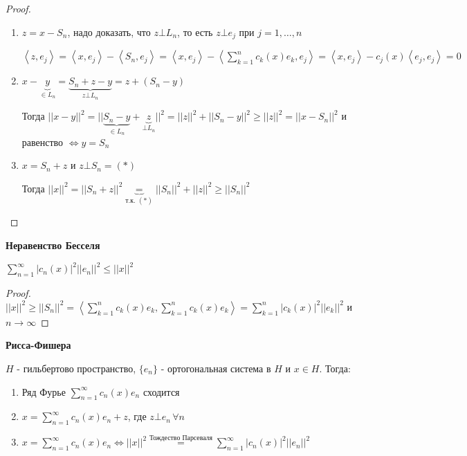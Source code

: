 \begin{proof}
    \begin{enumerate}
        \item {
            $z = x - S_n$, надо доказать, что $z \bot L_n$, то есть $z \bot e_j$ при $j = 1, \ldots, n$

            $\left < z, e_j \right > = \left < x, e_j \right > - \left < S_n, e_j \right > = \left < x, e_j \right > - \left < \sum_{k = 1}^n c_k (x) e_k, e_j \right > = 
            \left < x, e_j \right > - c_j (x) \left < e_j, e_j \right > = 0$
        }
        \item {
            $x - \underbrace{y}_{\in L_n} = \underbrace{S_n + z - y}_{z \bot L_n} = z + (S_n - y)$
            
            Тогда $||x - y||^2 = || \underbrace{S_n - y}_{\in L_n} + \underbrace{z}_{\bot L_n} ||^2 = ||z||^2 + ||S_n - y||^2 \geqslant ||z||^2 = ||x - S_n||^2$ и равенство $\Longleftrightarrow y = S_n$
        }
        \item {
            $x = S_n + z$ и $z \bot S_n = (*)$

            Тогда $||x||^2 = || S_n + z ||^2 \underbrace{=}_{\text{т.к. } (*)} ||S_n||^2 + ||z||^2 \geqslant ||S_n||^2$
        }
    \end{enumerate}
\end{proof}

\begin{consequence}
    \textbf{Неравенство Бесселя}

    $\sum_{n = 1}^\infty |c_n (x)|^2 ||e_n||^2 \leqslant ||x||^2$
\end{consequence}

\begin{proof}
    $||x||^2 \geqslant ||S_n||^2 = \left < \sum_{k = 1}^n c_k (x)e_k, \sum_{k = 1}^n c_k (x)e_k \right > = \sum_{k  = 1}^n |c_k (x)|^2 ||e_k||^2$ и $n \to \infty$
\end{proof}

\begin{theorem}
    \textbf{Рисса-Фишера}

    $H$ - гильбертово пространство, $\{ e_n \}$ - ортогональная система в $H$ и $x \in H$. Тогда:

    \begin{enumerate}
        \item {
            Ряд Фурье $\sum_{n = 1}^\infty c_n (x) e_n$ сходится
        }
        \item {
            $x = \sum_{n = 1}^\infty c_n (x) e_n + z$, где $z \bot e_n \, \forall n$

        }
        \item {
            $x = \sum_{n = 1}^\infty c_n(x) e_n \Longleftrightarrow ||x||^2 \overset{\text{Тождество Парсеваля}}{=} \sum_{n = 1}^\infty |c_n (x)|^2 ||e_n||^2$
        }
    \end{enumerate}
\end{theorem}

